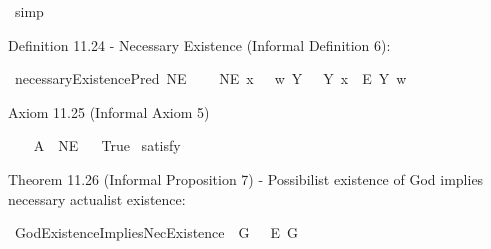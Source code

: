 \begin{isabellebody}
\ simp\isanewline
\ \ \isamarkupfalse%
\isanewline
{}\isamarkupfalse%
%
\endisatagproof
{\isafoldproof}%
%
\isadelimproof
%
\endisadelimproof
%
\begin{isamarkuptext}%
Definition 11.24 - Necessary Existence (Informal Definition 6):%
\end{isamarkuptext}\isamarkuptrue%
\isamarkupfalse%
\ necessaryExistencePred{\isacharcolon}{\isacharcolon}{\isachardoublequoteopen}{\isasymup}{\isasymlangle}{\isasymzero}{\isasymrangle}{\isachardoublequoteclose}\ {\isacharparenleft}{\isachardoublequoteopen}NE{\isachardoublequoteclose}{\isacharparenright}\ \isanewline
\ \ \ {\isachardoublequoteopen}NE\ x\ \ {\isasymequiv}\ {\isacharparenleft}{\isasymlambda}w{\isachardot}\ {\isacharparenleft}\isactrlbold {\isasymforall}Y{\isachardot}\ \ {\isasymE}\ Y\ x\ \isactrlbold {\isasymrightarrow}\ \isactrlbold {\isasymbox}\isactrlbold {\isasymexists}\isactrlsup E\ Y{\isacharparenright}\ w{\isacharparenright}{\isachardoublequoteclose}%
\begin{isamarkuptext}%
Axiom 11.25 (Informal Axiom 5)%
\end{isamarkuptext}\isamarkuptrue%
\isamarkupfalse%
\ \ \isanewline
\ A{}{\isacharcolon}\ {\isachardoublequoteopen}{\isasymlfloor}{\isasymP}\ NE{\isasymrfloor}{\isachardoublequoteclose}\isanewline
\ \isanewline
{}\isamarkupfalse%
\ True\ \isamarkupfalse%
{\isacharbrackleft}satisfy{\isacharbrackright}%
\isadelimproof
\ %
\endisadelimproof
%
\isatagproof
{}\isamarkupfalse%
\ %
%
\endisatagproof
{\isafoldproof}%
%
\isadelimproof
%
\endisadelimproof
%
\begin{isamarkuptext}%
Theorem 11.26 (Informal Proposition 7) - Possibilist existence of God implies necessary actualist existence:%
\end{isamarkuptext}\isamarkuptrue%
\isamarkupfalse%
\ GodExistenceImpliesNecExistence{\isacharcolon}\ {\isachardoublequoteopen}{\isasymlfloor}\isactrlbold {\isasymexists}\ G\ \isactrlbold {\isasymrightarrow}\ \ \isactrlbold {\isasymbox}\isactrlbold {\isasymexists}\isactrlsup E\ G{\isasymrfloor}{\isachardoublequoteclose}\isanewline
%
\isadelimproof
%
\endisadelimproof
%
\isatagproof
{}\isamarkupfalse%
\ {\isacharminus}\isanewline
\isacommand{{\isacharbraceleft}}\isamarkupfalse%
\isanewline
\ \ \isamarkupfalse%

\end{isabellebody}
